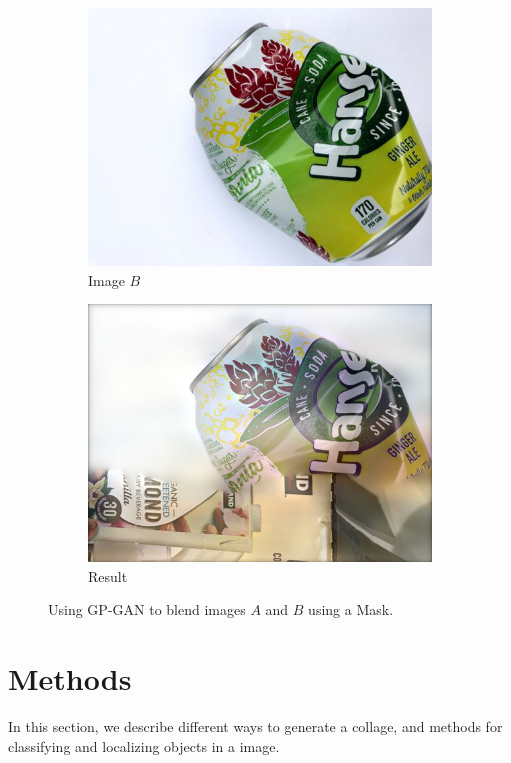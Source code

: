 \documentclass{article}
\begin{document}
\begin{figure}
\begin{subfigure}[b]{0.2\linewidth}
    \includegraphics[width=\linewidth]{data/images/04_GP_GAN/metal14.jpg}
    \caption{Image $B$}
  \end{subfigure}
  \begin{subfigure}[b]{0.2\linewidth}
    \includegraphics[width=\linewidth]{data/images/04_GP_GAN/result-cardboard331-metal14.png}
    \caption{Result}
  \end{subfigure}
  \caption{Using GP-GAN \cite{wu2019gp} to blend images $A$ and $B$ using a Mask.   }
  \label{fig:GAN_Blending}
\end{figure}



\section{ Methods }
In this section, we describe different ways to generate a collage, and methods for classifying and localizing objects in a image. 
\end{document}
